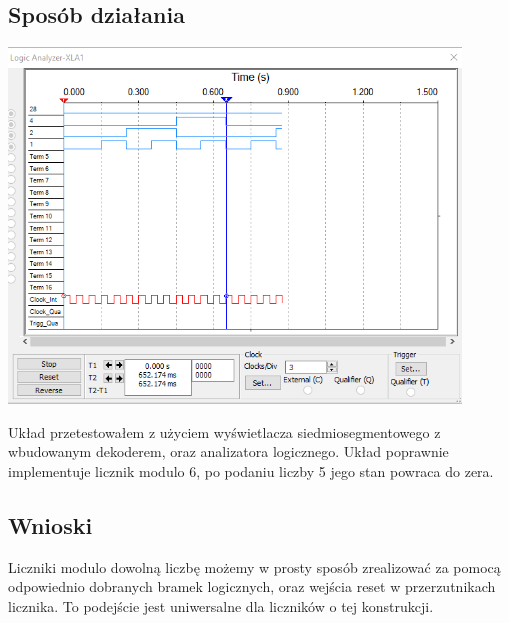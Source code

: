\documentclass{article}
\begin{document}
        \subsection{Sposób działania}
            \begin{center}
                \includegraphics[width=12cm]{reports/img/Z3D_2.png}\\
            \end{center}
            Układ przetestowałem z użyciem wyświetlacza siedmiosegmentowego z wbudowanym dekoderem, oraz analizatora logicznego. Układ poprawnie implementuje licznik modulo 6, po podaniu liczby 5 jego stan powraca do zera. 
            
        \subsection{Wnioski}
            Liczniki modulo dowolną liczbę możemy w prosty sposób zrealizować za pomocą odpowiednio dobranych bramek logicznych, oraz wejścia reset w przerzutnikach licznika. To podejście jest uniwersalne dla liczników o tej konstrukcji. 
    
\end{document}
